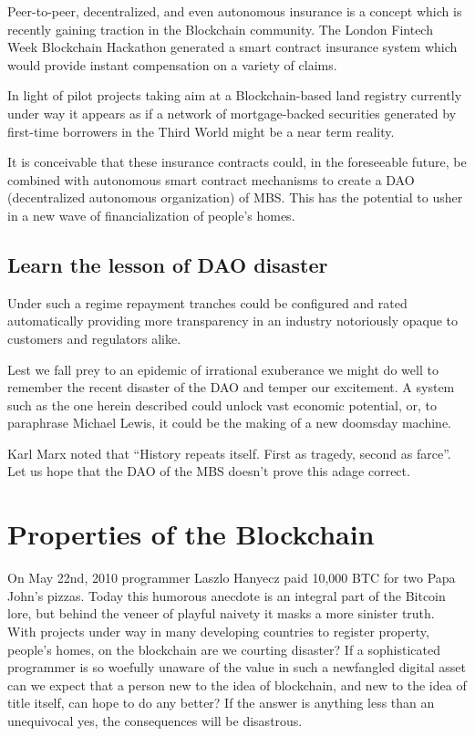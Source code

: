 Peer-to-peer, decentralized, and even autonomous insurance is a concept which is recently gaining traction in the Blockchain community. 
The London Fintech Week Blockchain Hackathon generated a smart contract insurance system which would provide instant compensation on a variety of claims.

In light of pilot projects taking aim at a Blockchain-based land registry currently under way it appears as if a network of mortgage-backed securities generated by first-time borrowers in the Third World might be a near term reality.

It is conceivable that these insurance contracts could, in the foreseeable future, be combined with autonomous smart contract mechanisms to create a DAO (decentralized autonomous organization) of MBS. This has the potential to usher in a new wave of financialization of people's homes.

\subsection*{Learn the lesson of DAO disaster}

Under such a regime repayment tranches could be configured and rated automatically providing more transparency in an industry notoriously opaque to customers and regulators alike.

Lest we fall prey to an epidemic of irrational exuberance we might do well to remember the recent disaster of the DAO and temper our excitement. A system such as the one herein described could unlock vast economic potential, or, to paraphrase Michael Lewis, it could be the making of a new doomsday machine.

Karl Marx noted that ``History repeats itself. First as tragedy, second as farce''. Let us hope that the DAO of the MBS doesn't prove this adage correct.

\section*{Properties of the Blockchain}

On May 22nd, 2010 programmer Laszlo Hanyecz paid 10,000 BTC for two Papa John's pizzas. Today this humorous anecdote is an integral part of the Bitcoin lore, but behind the veneer of playful naivety it masks a more sinister truth. With projects under way in many developing countries to register property, people's homes, on the blockchain are we courting disaster? If a sophisticated programmer is so woefully unaware of the value in such a newfangled digital asset can we expect that a person new to the idea of blockchain, and new to the idea of title itself, can hope to do any better? If the answer is anything less than an unequivocal yes, the consequences will be disastrous.

